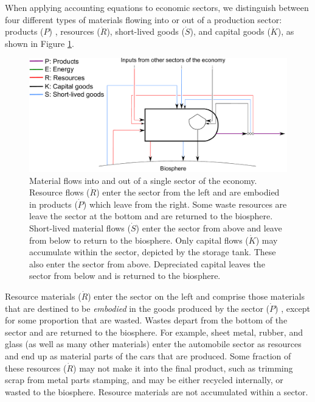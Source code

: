 When applying accounting equations to economic sectors,
we distinguish between four different types of
materials flowing into or out of a production sector: 
products ($P$) , 
resources ($\dot{R}$),
short-lived goods ($\dot{S}$),
and capital goods ($\dot{K}$), 
as shown in Figure \ref{fig:PERKS_materials}.

\begin{figure}[h!]
\centering
\includegraphics[width=0.8\linewidth]{Part_1/Chapter_Materials/images/PERKS_basic_unit_materials.pdf}
\caption[Material flows into and out of a single sector of the economy.]{Material flows into and out of a single sector of the economy. Resource flows ($\dot{R}$) enter the sector from the left and are embodied in products ($\dot{P}$) which leave from the right. Some waste resources are leave the sector at the bottom and are returned to the biosphere. Short-lived material flows ($\dot{S}$) enter the sector from above and leave from below to return to the biosphere.  Only capital flows ($\dot{K}$) may accumulate within the sector, depicted by the storage tank. These also enter the sector from above. Depreciated capital leaves the sector from below and is returned to the biosphere.}
\label{fig:PERKS_materials}
\end{figure}

Resource materials ($\dot{R}$) 
enter the sector on the left 
and comprise those materials that are destined to be \emph{embodied} 
in the goods produced by the sector ($\dot{P}$) , 
except for some proportion that are wasted.
Wastes depart from the bottom of the sector and are
returned to the biosphere. 
For example, sheet metal, rubber, and glass
(as well as many other materials) 
enter the automobile sector as resources 
and end up as material parts of the cars that are produced. 
Some fraction of these resources ($\dot{R}$) may not make it into the final product, 
such as trimming scrap from metal parts stamping, 
and may be either recycled internally, 
or wasted to the biosphere. 
Resource materials are not accumulated within a sector.

